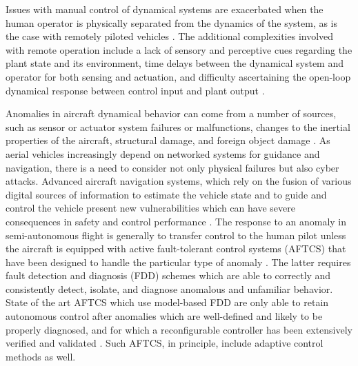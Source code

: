 

Issues with manual control of dynamical systems are exacerbated when the human operator is physically separated from the dynamics of the system, as is the case with remotely piloted vehicles \cite{mccarley2004human, tvaryanas2008recurrent}. The additional complexities involved with remote operation include a lack of sensory and perceptive cues regarding the plant state and its environment, time delays between the dynamical system and operator for both sensing and actuation, and difficulty ascertaining the open-loop dynamical response between control input and plant output \cite{lam2008haptic}. 

Anomalies in aircraft dynamical behavior can come from a number of sources, such as sensor or actuator system failures or malfunctions, changes to the inertial properties of the aircraft, structural damage, and foreign object damage \cite{belcastro2016aircraft}. As aerial vehicles increasingly depend on networked systems for guidance and navigation, there is a need to consider not only physical failures but also cyber attacks. Advanced aircraft navigation systems, which rely on the fusion of various digital sources of information to estimate the vehicle state and to guide and control the vehicle present new vulnerabilities which can have severe consequences in safety and control performance \cite{kim2012cyber, kerns2014unmanned, kwon2014analysis, amin2009safe}. The response to an anomaly in semi-autonomous flight is generally to transfer control to the human pilot unless the aircraft is equipped with active fault-tolerant control systems (AFTCS) that have been designed to handle the particular type of anomaly \cite{zhang2008bibliographical}. The latter requires fault detection and diagnosis (FDD) schemes which are able to correctly and consistently detect, isolate, and diagnose anomalous and unfamiliar behavior. State of the art AFTCS which use model-based FDD are only able to retain autonomous control after anomalies which are well-defined and likely to be properly diagnosed, and for which a reconfigurable controller has been extensively verified and validated \cite{zhang2008bibliographical}. Such AFTCS, in principle, include adaptive control methods as well.



